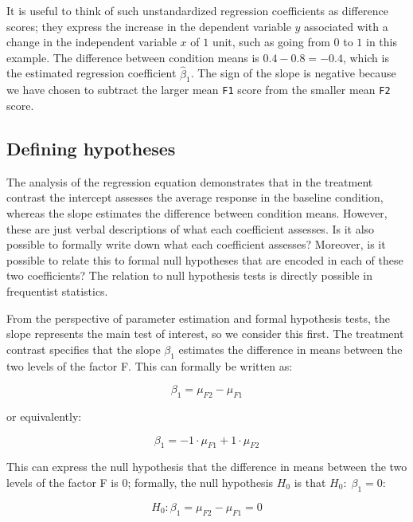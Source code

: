 \documentclass[
  12pt,
]{krantz}
\theoremstyle{definition}
\theoremstyle{definition}
\theoremstyle{definition}
\theoremstyle{definition}
\theoremstyle{remark}
\begin{document}
It is useful to think of such unstandardized regression coefficients as difference scores; they express the increase in the dependent variable \(y\) associated with a change in the independent variable \(x\) of \(1\) unit, such as going from \(0\) to \(1\) in this example. The difference between condition means is \(0.4 - 0.8 = -0.4\), which is the estimated regression coefficient \(\hat{\beta}_1\). The sign of the slope is negative because we have chosen to subtract the larger mean \texttt{F1} score from the smaller mean \texttt{F2} score.

\hypertarget{inverseMatrix}{%
\subsection{Defining hypotheses}\label{inverseMatrix}}

The analysis of the regression equation demonstrates that in the treatment contrast the intercept assesses the average response in the baseline condition, whereas the slope estimates the difference between condition means. However, these are just verbal descriptions of what each coefficient assesses. Is it also possible to formally write down what each coefficient assesses? Moreover, is it possible to relate this to formal null hypotheses that are encoded in each of these two coefficients? The relation to null hypothesis tests is directly possible in frequentist statistics.

From the perspective of parameter estimation and formal hypothesis tests, the slope represents the main test of interest, so we consider this first. The treatment contrast specifies that the slope \(\beta_1\) estimates the difference in means between the two levels of the factor F. This can formally be written as:

\begin{equation}
\beta_1 = \mu_{F2} - \mu_{F1}
\end{equation}

or equivalently:

\begin{equation}
\beta_1 = - 1 \cdot \mu_{F1} + 1 \cdot \mu_{F2}
\end{equation}

This can express the null hypothesis that the difference in means between the two levels of the factor F is \(0\); formally, the null hypothesis \(H_0\) is that \(H_0: \; \beta_1 = 0\):

\begin{equation} \label{eq:f2minusf1}
H_0: \beta_1 = \mu_{F2} - \mu_{F1} = 0
\end{equation}
\end{document}

